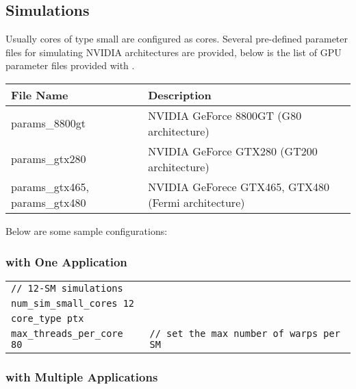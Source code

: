 \subsection{\gpu Simulations}

Usually cores of type small are configured as \gpu cores. Several pre-defined
parameter files for simulating NVIDIA architectures are provided, below is the
list of GPU parameter files provided with \SIM.

\begin{center}
 \begin{tabular}{| l | l |}
  \hline
  File Name & Description \\ \hline \hline
  params\_8800gt &  NVIDIA GeForce 8800GT (G80 architecture) \\
  params\_gtx280 &  NVIDIA GeForce GTX280 (GT200 architecture) \\
  params\_gtx465, params\_gtx480 & NVIDIA GeForece GTX465, GTX480 (Fermi architecture) \\
  \hline
 \end{tabular}
\end{center}

\noindent Below are some sample configurations:

\subsubsection*{\gpu with One Application}

\begin{tabular}{l l}
 \Verb+// 12-SM simulations+ & \Verb++ \\
 \Verb+num_sim_small_cores 12+ & \Verb++ \\
 \Verb+core_type ptx+ & \Verb++ \\
 \Verb+max_threads_per_core 80+ & \Verb+// set the max number of warps per SM+
\end{tabular}

\subsubsection*{\gpu with Multiple Applications}

